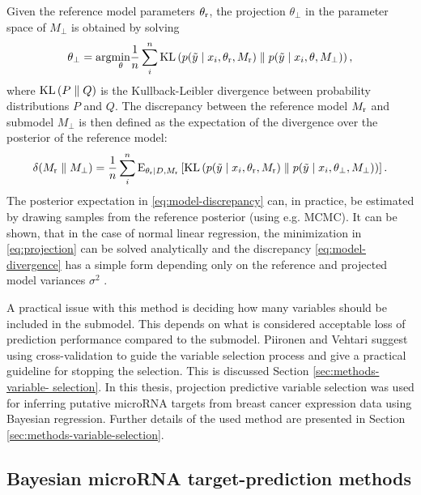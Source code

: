 Given the reference model parameters $\theta_{\textup{r}}$, the projection $\theta_\perp$
in the parameter space of $M_\perp$ is obtained by solving
\begin{equation}
  \label{eq:projection}
  \theta_\perp = \textup{arg}\underset{\theta}{\textup{min}} \frac{1}{n}\sum_i^n \textup{KL} \left ( p(\tilde{y} \mid x_i, \theta_{\textup{r}}, M_{\textup{r}}) \parallel p(\tilde{y} \mid x_i, \theta, M_\perp) \right ),
\end{equation}
where $\textup{KL} \left ( P \parallel Q \right )$ is the Kullback-Leibler divergence
between probability distributions $P$ and $Q$. The discrepancy between the reference
model  $M_{\textup{r}}$ and submodel $M_\perp$ is then defined as the expectation
of the divergence over the posterior of the reference model:
\begin{equation}
  \label{eq:model-discrepancy}
  \delta(M_{\textup{r}} \parallel M_\perp) = \frac{1}{n} \sum_i^n \textup{E}_{\theta_{\textup{r}} \mid D,M_\textup{r}} \left [ \textup{KL} \left ( p(\tilde{y} \mid x_i, \theta_{\textup{r}}, M_{\textup{r}}) \parallel p(\tilde{y} \mid x_i, \theta_\perp, M_\perp) \right ) \right ].
\end{equation}
The posterior expectation in \eqref{eq:model-discrepancy} can, in practice, be
estimated by drawing samples from the reference posterior (using e.g. MCMC).
It can be shown, that in the case of normal linear regression, the
minimization in \eqref{eq:projection} can be solved analytically and the
discrepancy \eqref{eq:model-divergence} has a simple form depending only on
the reference and projected model variances $\sigma^2$ \citep{Piironen2015}.

A practical issue with this method is deciding how many variables should be
included in the submodel. This depends on what is considered acceptable
loss of prediction performance compared to the submodel. Piironen and Vehtari suggest using cross-validation to
guide the variable selection process and give a practical guideline for
stopping the selection. This is discussed Section \ref{sec:methods-variable-
selection}. In this thesis, projection predictive variable selection was used
for inferring putative microRNA targets from breast cancer expression data
using Bayesian regression. Further details of the used method are presented in
Section \ref{sec:methods-variable-selection}.




\subsection{Bayesian microRNA target-prediction methods}

